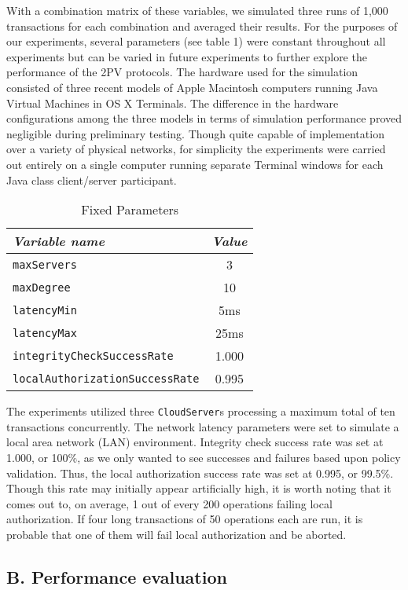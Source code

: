\documentclass[11pt]{article}
\begin{document}
With a combination matrix of these variables, we simulated three runs of 1,000 transactions for each combination and averaged their results. For the purposes of our experiments, several parameters (see table 1) were constant throughout all experiments but can be varied in future experiments to further explore the performance of the 2PV protocols. The hardware used for the simulation consisted of three recent models of Apple Macintosh computers running Java Virtual Machines in OS X Terminals. The difference in the hardware configurations among the three models in terms of simulation performance proved negligible during preliminary testing. Though quite capable of implementation over a variety of physical networks, for simplicity the experiments were carried out entirely on a single computer running separate Terminal windows for each Java class client/server participant.
\begin{table}[htdp]
\begin{center}\begin{tabular}{|l|c|}\hline \emph{Variable name} & \emph{Value} \\\hline \texttt{maxServers} & 3 \\\hline \texttt{maxDegree} & 10 \\\hline \texttt{latencyMin} & 5ms \\\hline \texttt{latencyMax} & 25ms \\\hline \texttt{integrityCheckSuccessRate} & 1.000 \\\hline \texttt{localAuthorizationSuccessRate} & 0.995 \\\hline \end{tabular} \caption{Fixed Parameters}
\end{center}
\label{Fixed}
\end{table}
The experiments utilized three \texttt{CloudServer}s processing a maximum total of ten transactions concurrently. The network latency parameters were set to simulate a local area network (LAN) environment. Integrity check success rate was set at 1.000, or 100\%, as we only wanted to see successes and failures based upon policy validation. Thus, the local authorization success rate was set at 0.995, or 99.5\%. Though this rate may initially appear artificially high, it is worth noting that it comes out to, on average, 1 out of every 200 operations failing local authorization. If four long transactions of 50 operations each are run, it is probable that one of them will fail local authorization and be aborted.
\subsection{B. Performance evaluation}
\end{document}
